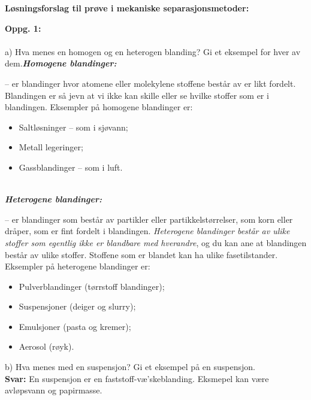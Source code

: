 \documentclass{minmal}
\begin{document}
\begin{center}
    \textbf{Løsningsforslag til prøve i mekaniske separasjonsmetoder:}
\end{center}
\noindent
\textbf{Oppg. 1:}\\\\
\noindent
a) Hva menes en homogen og en heterogen blanding? Gi et eksempel for hver av dem.\nl[2]
\textbf{\textit{\textbf{\textit{Homogene blandinger:}}}}

\noindent – er blandinger hvor atomene eller molekylene stoffene består av er likt fordelt. Blandingen er så jevn at vi ikke kan skille eller se hvilke stoffer som er i blandingen. Eksempler på homogene blandinger er:

\begin{itemize}
    \item Saltløsninger – som i sjøvann;
    \item Metall legeringer;
    \item Gassblandinger – som i luft.\\\\
\end{itemize}
\textbf{\textit{\textit{Heterogene blandinger:}}}

– er blandinger som består av partikler eller partikkelstørrelser, som korn eller dråper, som er fint fordelt i blandingen. \textit{Heterogene blandinger består av ulike stoffer som egentlig ikke er blandbare med hverandre}, og du kan ane at blandingen består av ulike stoffer. Stoffene som er blandet kan ha ulike fasetilstander. Eksempler på heterogene blandinger er:

\begin{itemize}
    \item Pulverblandinger (tørrstoff blandinger);
    \item Suspensjoner (deiger og slurry);
    \item Emulsjoner (pasta og kremer);
    \item Aerosol (røyk).
\end{itemize}
 \newpage
\noindent b) Hva menes med en suspensjon? Gi et eksempel på en suspensjon. \nl[1]\\
\textbf{Svar:} En suspensjon er en faststoff-væ'skeblanding. Eksmepel kan være avløpsvann og papirmasse.\nl[2]
\end{document}
